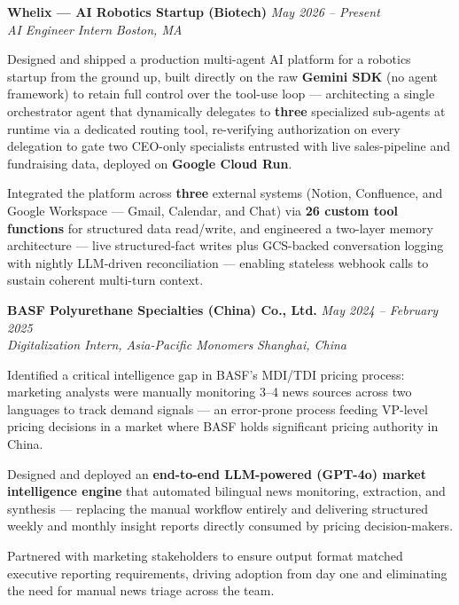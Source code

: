 \documentclass[letterpaper,11pt]{article}
\newcommand{\jobheader}[4]{%
  \vspace{1pt}%
  {\textbf{#1} \hfill \textit{#3}} \\[-2pt]
  {\textit{#2} \hfill \textit{#4}} \\[-4pt]
}
\begin{document}
\jobheader{Whelix — AI Robotics Startup (Biotech)}{AI Engineer Intern}{May 2026 -- Present}{Boston, MA}
{\small\begin{rbullet}
  \item Designed and shipped a production multi-agent AI platform for a robotics startup from the ground up, built directly on the raw \textbf{Gemini SDK} (no agent framework) to retain full control over the tool-use loop — architecting a single orchestrator agent that dynamically delegates to \textbf{three} specialized sub-agents at runtime via a dedicated routing tool, re-verifying authorization on every delegation to gate two CEO-only specialists entrusted with live sales-pipeline and fundraising data, deployed on \textbf{Google Cloud Run}.
  \item Integrated the platform across \textbf{three} external systems (Notion, Confluence, and Google Workspace — Gmail, Calendar, and Chat) via \textbf{26 custom tool functions} for structured data read/write, and engineered a two-layer memory architecture — live structured-fact writes plus GCS-backed conversation logging with nightly LLM-driven reconciliation — enabling stateless webhook calls to sustain coherent multi-turn context.
\end{rbullet}
}

\jobheader{BASF Polyurethane Specialties (China) Co., Ltd.}{Digitalization Intern, Asia-Pacific Monomers}{May 2024 -- February 2025}{Shanghai, China}
{\small\begin{rbullet}
  \item Identified a critical intelligence gap in BASF's MDI/TDI pricing process: marketing analysts were manually monitoring 3--4 news sources across two languages to track demand signals — an error-prone process feeding VP-level pricing decisions in a market where BASF holds significant pricing authority in China.
  \item Designed and deployed an \textbf{end-to-end LLM-powered (GPT-4o) market intelligence engine} that automated bilingual news monitoring, extraction, and synthesis — replacing the manual workflow entirely and delivering structured weekly and monthly insight reports directly consumed by pricing decision-makers.
  \item Partnered with marketing stakeholders to ensure output format matched executive reporting requirements, driving adoption from day one and eliminating the need for manual news triage across the team.
\end{rbullet}
}
\end{document}
